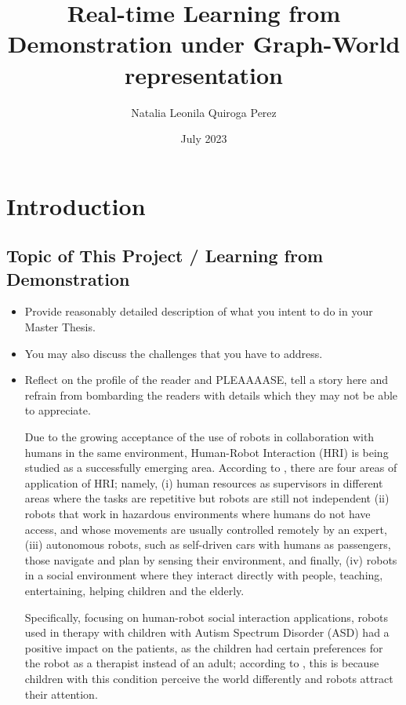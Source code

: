 \documentclass[thesis]{mas_proposal}
\title{Real-time Learning from Demonstration under Graph-World representation}
\author{Natalia Leonila Quiroga Perez}
\date{July 2023}
\begin{document}
\maketitle

\pagestyle{plain}

\section{Introduction}

\subsection{Topic of This  Project / Learning from Demonstration }
\begin{itemize}
    \item Provide reasonably detailed description of what you intent to do in your Master Thesis.
    \item You may also discuss the challenges that you have to address.
    \item Reflect on the profile of the reader and PLEAAAASE, tell a story here and refrain from bombarding the readers with details which they may not be able to appreciate.

    Due to the growing acceptance of the use of robots in collaboration with humans in the same environment, Human-Robot Interaction (HRI) is being studied as a successfully emerging area. According to \cite{sheridan2016}, there are four areas of application of HRI; namely, (i) human resources as supervisors in different areas where the tasks are repetitive but robots are still not independent (ii) robots that work in hazardous environments where humans do not have access, and whose movements are usually controlled remotely by an expert, (iii) autonomous robots, such as self-driven cars with humans as passengers, those navigate and plan by sensing their environment, and finally, (iv) robots in a social environment where they interact directly with people, teaching, entertaining, helping children and the elderly.
    
    Specifically, focusing on human-robot social interaction applications, robots used in therapy with children with Autism Spectrum Disorder (ASD) had a positive impact on the patients, as the children had certain preferences for the robot as a therapist instead of an adult; according to \cite{prabha2019}, this is because children with this condition perceive the world differently and robots attract their attention.
    

\end{itemize}
\end{document}
